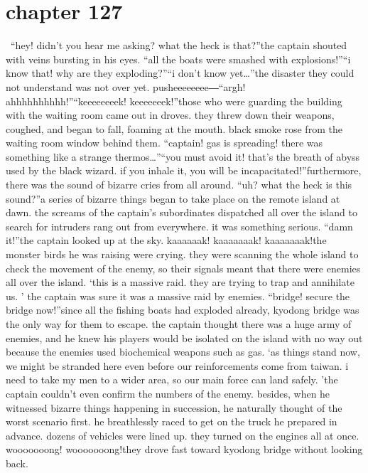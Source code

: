 \section{chapter 127}






 “hey! didn’t you hear me asking? what the heck is that?”the captain shouted with veins bursting in his eyes.
“all the boats were smashed with explosions!”“i know that! why are they exploding?”“i don’t know yet…”the disaster they could not understand was not over yet.
pusheeeeeeee―“argh! ahhhhhhhhhh!”“keeeeeeeek! keeeeeeek!”those who were guarding the building with the waiting room came out in droves.
they threw down their weapons, coughed, and began to fall, foaming at the mouth.
black smoke rose from the waiting room window behind them.
“captain! gas is spreading! there was something like a strange thermos…”“you must avoid it! that’s the breath of abyss used by the black wizard.
 if you inhale it, you will be incapacitated!”furthermore, there was the sound of bizarre cries from all around.
“uh? what the heck is this sound?”a series of bizarre things began to take place on the remote island at dawn.
 the screams of the captain’s subordinates dispatched all over the island to search for intruders rang out from everywhere.
 it was something serious.
“damn it!”the captain looked up at the sky.
kaaaaaak! kaaaaaaak! kaaaaaaak!the monster birds he was raising were crying.
 they were scanning the whole island to check the movement of the enemy, so their signals meant that there were enemies all over the island.
‘this is a massive raid.
 they are trying to trap and annihilate us.
’
the captain was sure it was a massive raid by enemies.
“bridge! secure the bridge now!”since all the fishing boats had exploded already, kyodong bridge was the only way for them to escape.
 the captain thought there was a huge army of enemies, and he knew his players would be isolated on the island with no way out because the enemies used biochemical weapons such as gas.
‘as things stand now, we might be stranded here even before our reinforcements come from taiwan.
 i need to take my men to a wider area, so our main force can land safely.
’the captain couldn’t even confirm the numbers of the enemy.
 besides, when he witnessed bizarre things happening in succession, he naturally thought of the worst scenario first.
he breathlessly raced to get on the truck he prepared in advance.
 dozens of vehicles were lined up.
 they turned on the engines all at once.
wooooooong! wooooooong!they drove fast toward kyodong bridge without looking back.
